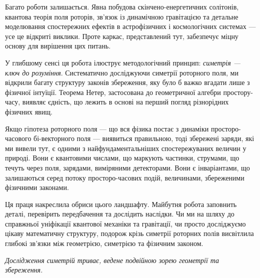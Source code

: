 \documentclass[11pt,a4paper]{article}
\numberwithin{equation}{section}
\theoremstyle{plain}
\theoremstyle{definition}
\theoremstyle{remark}
\newif\ifack
\begin{document}
Багато роботи залишається. Явна побудова скінчено-енергетичних солітонів, квантова теорія поля роторів, зв'язок із динамічною гравітацією та детальне моделювання спостережних ефектів в астрофізичних і космологічних системах — усе це відкриті виклики. Проте каркас, представлений тут, забезпечує міцну основу для вирішення цих питань.

У глибшому сенсі ця робота ілюструє методологічний принцип: \emph{симетрія — ключ до розуміння}. Систематично досліджуючи симетрії роторного поля, ми відкрили багату структуру законів збереження, яку було б важко вгадати лише з фізичної інтуїції. Теорема Нетер, застосована до геометричної алгебри простору-часу, виявляє єдність, що лежить в основі на перший погляд різнорідних фізичних явищ.

Якщо гіпотеза роторного поля — що вся фізика постає з динаміки просторо-часового бі-векторного поля — виявиться правильною, тоді збережені заряди, які ми вивели тут, є одними з найфундаментальніших спостережуваних величин у природі. Вони є квантовими числами, що маркують частинки, струмами, що течуть через поля, зарядами, виміряними детекторами. Вони є інваріантами, що залишаються серед потоку просторо-часових подій, величинами, збереженими фізичними законами.

Ця праця накреслила обриси цього ландшафту. Майбутня робота заповнить деталі, перевірить передбачення та дослідить наслідки. Чи ми на шляху до справжньої уніфікації квантової механіки та гравітації, чи просто досліджуємо цікаву математичну структуру, подорож крізь симетрії роторних полів висвітлила глибокі зв'язки між геометрією, симетрією та фізичним законом.

\medskip
\noindent\textit{Дослідження симетрій триває, ведене подвійною зорею геометрії та збереження.}

\ifack
\section*{Подяки}
Автор завдячує Еммі Нетер, чия теорема вела покоління фізиків. Розвиток геометричної алгебри Девідом Гестенесом і її застосування до гравітації Ентоні Лазенбі, Крісом Дораном та Стівеном Галлом стали наріжними каменями. Роботу виконано незалежно, без зовнішнього фінансування. За можливі похибки відповідає автор.
\fi

\appendix
\end{document}
